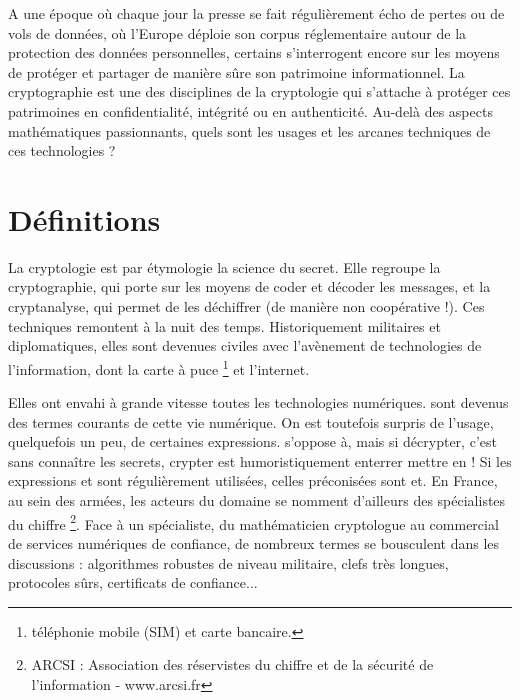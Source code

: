 

A une époque où chaque jour la presse se fait régulièrement écho de pertes ou de vols de données, où l'Europe déploie son corpus réglementaire autour de la protection des données personnelles, certains s'interrogent encore sur les moyens de protéger et partager de manière sûre son patrimoine informationnel. La cryptographie est une des disciplines de la cryptologie qui s'attache à protéger ces patrimoines en confidentialité, intégrité ou en authenticité. Au-delà des aspects mathématiques passionnants, quels sont les usages et les arcanes techniques de ces technologies ?

\section{Définitions}

 La cryptologie est par étymologie la science du secret. Elle regroupe la cryptographie, qui porte sur les moyens de coder et décoder les messages, et la cryptanalyse, qui permet de les déchiffrer (de manière non coopérative !).
Ces techniques remontent à la nuit des temps. Historiquement militaires et diplomatiques, elles sont devenues civiles avec l'avènement de technologies de l'information, dont la carte à puce \footnote{téléphonie mobile (SIM) et carte bancaire. } et l'internet.

Elles ont envahi à grande vitesse toutes les technologies numériques. sont devenus des termes courants de cette vie numérique. On est toutefois surpris de l'usage, quelquefois un peu, de certaines expressions. s'oppose à, mais si décrypter, c'est sans connaître les secrets, crypter est humoristiquement enterrer  mettre en ! Si les expressions et sont régulièrement utilisées, celles préconisées sont et. En France, au sein des armées, les acteurs du domaine se nomment d'ailleurs des spécialistes du chiffre \footnote{ARCSI : Association des réservistes du chiffre et de la sécurité de l'information - www.arcsi.fr}. Face à un spécialiste, du mathématicien cryptologue au commercial de services numériques de confiance, de nombreux termes se bousculent dans les discussions : algorithmes robustes de niveau militaire, clefs très longues, protocoles sûrs, certificats de confiance...

